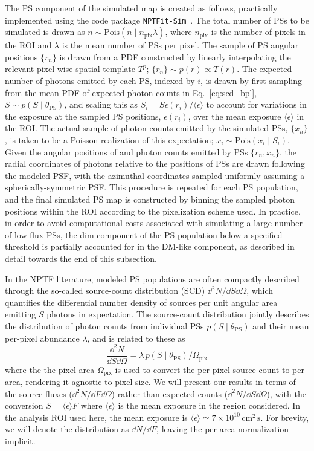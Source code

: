 \documentclass[prd,aps,10pt,nofootinbib,twocolumn,superscriptaddress,preprintnumbers,balancelastpage,longbibliography,floatfix]{revtex4-2}
\begin{document}
The PS component of the simulated \Fermi map is created as follows, practically implemented using the code package \texttt{NPTFit-Sim}~\cite{NPTFit-Sim}. The total number of PSs to be simulated is drawn as $n \sim \mathrm{Pois}(n\mid n_\mathrm{pix}\lambda)$, where $n_\mathrm{pix}$ is the number of pixels in the ROI and $\lambda$ is the mean number of PSs per pixel. The sample of PS angular positions $\{r_n\}$ is drawn from a PDF constructed by linearly interpolating the relevant pixel-wise spatial template $T^p$; $\{r_n\} \sim p(r) \propto T(r)$. The expected number of photons emitted by each PS, indexed by $i$, is drawn by first sampling from the mean PDF of expected photon counts in Eq.~\eqref{eq:scd_bpl}, $S \sim p\left({S}\mid\theta_\mathrm{PS}\right)$, and scaling this as ${S_i} = S \epsilon(r_i) / \langle \epsilon \rangle$ to account for variations in the \Fermi exposure at the sampled PS positions, $\epsilon(r_i)$, over the mean exposure $\langle \epsilon \rangle$ in the ROI. The actual sample of photon counts emitted by the simulated PSs, $\{x_n\}$, is taken to be a Poisson realization of this expectation; ${x_i} \sim \mathrm{Pois}\left({x_i}\mid {S_i}\right)$. Given the angular positions of and photon counts emitted by PSs $\{r_n, x_n\}$, the radial coordinates of photons relative to the positions of PSs are drawn following the modeled \Fermi PSF, with the azimuthal coordinates sampled uniformly assuming a spherically-symmetric PSF. This procedure is repeated for each PS population, and the final simulated PS map is constructed by binning the sampled photon positions within the ROI according to the pixelization scheme used. In practice, in order to avoid computational costs associated with simulating a large number of low-flux PSs, the dim component of the PS population below a specified threshold is partially accounted for in the DM-like component, as described in detail towards the end of this subsection.

In the NPTF literature, modeled PS populations are often compactly described through the so-called source-count distribution (SCD) $\dd^2 N /\dd S \dd\Omega$, which quantifies the differential number density of sources per unit angular area emitting $S$ photons in expectation. The source-count distribution jointly describes the distribution of photon counts from individual PSs $p(S\mid\theta_\mathrm{PS})$ and their mean per-pixel abundance $\lambda$, and is related to these as
\begin{equation}
\label{eq:scd_ps}
\frac{\dd^2 N}{\dd S\dd\Omega}=\lambda \, p(S\mid\theta_\mathrm{PS}) / \Omega_\mathrm{pix}
\end{equation}
where the the pixel area $\Omega_\mathrm{pix}$ is used to convert the per-pixel source count to per-area, rendering it agnostic to pixel size. We will present our results in terms of the source fluxes ($\dd^2 N /\dd F\dd\Omega$) rather than expected counts ($\dd^2 N /\dd S\dd\Omega$), with the conversion $S = \langle \epsilon \rangle F$ where $\langle \epsilon \rangle$ is the mean exposure in the region considered. In the analysis ROI used here, the mean exposure is $\langle \epsilon \rangle \simeq 7\times 10^{10}\,\mathrm{cm}^{2}\,\mathrm{s}$. For brevity, we will denote the distribution as $\dd N /\dd F$, leaving the per-area normalization implicit. 
\end{document}
